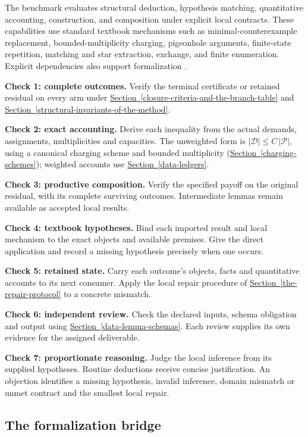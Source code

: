 \documentclass[
  11pt,
]{article}
\theoremstyle{definition}
\newcommand{\secref}[1]{\hyperref[#1]{Section~\ref*{#1}}}
\begin{document}
The benchmark evaluates structural deduction, hypothesis matching,
quantitative accounting, construction, and composition under explicit local
contracts. These capabilities use standard textbook mechanisms such as
minimal-counterexample replacement, bounded-multiplicity charging,
pigeonhole arguments, finite-state repetition, matching and star extraction,
exchange, and finite enumeration. Explicit dependencies also support
formalization \citep{wu-etal-2022-autoformalization,
jiang-etal-2022-draft-sketch-prove,yang-etal-2023-leandojo}.

\textbf{Check 1: complete outcomes.} Verify the terminal certificate or retained
residual on every arm under
\secref{closure-criteria-and-the-branch-table} and
\secref{structural-invariants-of-the-method}.

\textbf{Check 2: exact accounting.} Derive each inequality from the actual
demands, assignments, multiplicities and capacities. The unweighted form is
\(|\mathcal D|\le C\,|\mathcal P|\), using a canonical charging scheme and
bounded multiplicity (\secref{charging-schemes}); weighted accounts use
\secref{data-ledgers}.

\textbf{Check 3: productive composition.} Verify the specified payoff on the
original residual, with its complete surviving outcomes. Intermediate lemmas
remain available as accepted local results.

\textbf{Check 4: textbook hypotheses.} Bind each imported result and local
mechanism to the exact objects and available premises. Give the direct
application and record a missing hypothesis precisely when one occurs.

\textbf{Check 5: retained state.} Carry each outcome's objects, facts and
quantitative accounts to its next consumer. Apply the local repair procedure
of \secref{the-repair-protocol} to a concrete mismatch.

\textbf{Check 6: independent review.} Check the declared inputs, schema
obligation and output using \secref{data-lemma-schemas}. Each review supplies
its own evidence for the assigned deliverable.

\textbf{Check 7: proportionate reasoning.} Judge the local inference from its
supplied hypotheses. Routine deductions receive concise justification. An
objection identifies a missing hypothesis, invalid inference, domain mismatch
or unmet contract and the smallest local repair.

\subsection{The formalization
bridge}\label{the-formalization-bridge}
\end{document}
